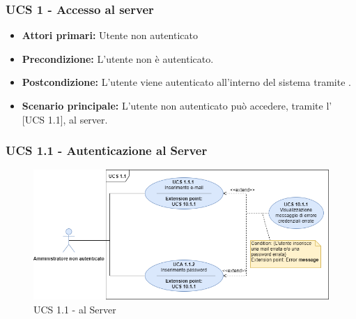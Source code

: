 \subsubsection{UCS 1 - Accesso al server}%

\begin{itemize}
\item \textbf{Attori primari:} Utente non autenticato
\item \textbf{Precondizione:} L'utente non è autenticato.
\item \textbf{Postcondizione:} L'utente viene autenticato all'interno del sistema tramite .
\item \textbf{Scenario principale:} L'utente non autenticato può accedere, tramite l' [UCS 1.1], al server. 
\end{itemize}

\subsubsection{UCS 1.1 - Autenticazione al Server}

\begin{figure}[h]
    \centering
    \includegraphics[scale=0.6]{Sezioni/UseCase/Immagini/UCS1.1.png}
    \caption{UCS 1.1 -  al Server}
\end{figure}

